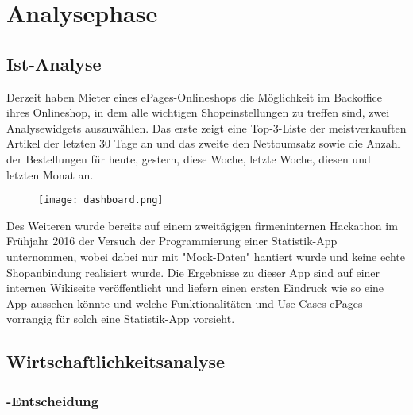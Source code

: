 \section{Analysephase} 
\label{sec:Analysephase}


\subsection{Ist-Analyse} 
\label{sec:IstAnalyse}
Derzeit haben Mieter eines ePages-Onlineshops die Möglichkeit im Backoffice ihres Onlineshop, in dem alle wichtigen Shopeinstellungen zu treffen sind, zwei Analysewidgets auszuwählen. Das erste zeigt eine Top-3-Liste der meistverkauften Artikel der letzten 30 Tage an und das zweite den Nettoumsatz sowie die Anzahl der Bestellungen für heute, gestern, diese Woche, letzte Woche, diesen und letzten Monat an.
\begin{figure}[htb]
\begin{center}
\texttt{[image: dashboard.png]}
\end{center}
\end{figure}
Des Weiteren wurde bereits auf einem zweitägigen firmeninternen Hackathon im Frühjahr 2016 der Versuch der Programmierung einer Statistik-App unternommen, wobei dabei nur mit "Mock-Daten" hantiert wurde und keine echte Shopanbindung realisiert wurde. Die Ergebnisse zu dieser App sind auf einer internen Wikiseite veröffentlicht und liefern einen ersten Eindruck wie so eine App aussehen könnte und welche Funktionalitäten und Use-Cases ePages vorrangig für solch eine Statistik-App vorsieht.

\subsection{Wirtschaftlichkeitsanalyse}
\label{sec:Wirtschaftlichkeitsanalyse}

\subsubsection{-Entscheidung}
\label{sec:MakeOrBuyEntscheidung}

